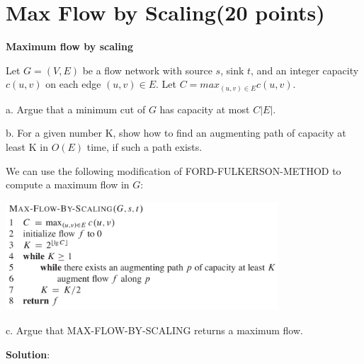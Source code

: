 \documentclass{article}
\begin{document}
\section{Max Flow by Scaling(20 points)}
\textbf{Maximum flow by scaling}

Let $G=(V, E)$ be a flow network with source $s$, sink $t$, and an integer capacity $c(u, v)$ on each edge $(u, v)\in{E}$. Let $C=max_{(u,v)\in{E}}c(u,v)$.

a. Argue that a minimum cut of $G$ has capacity at most $C|E|$.

b. For a given number K, show how to find an augmenting path of capacity at least K in $O(E)$ time, if such a path exists.

We can use the following modification of FORD-FULKERSON-METHOD to compute a maximum flow in $G$:

\begin{center} %
\includegraphics[width=4.00in,height=1.60in]{hw5_1.png}
\end{center}


c. Argue that MAX-FLOW-BY-SCALING returns a maximum flow.\newline

\textbf{Solution}:
\end{document}
